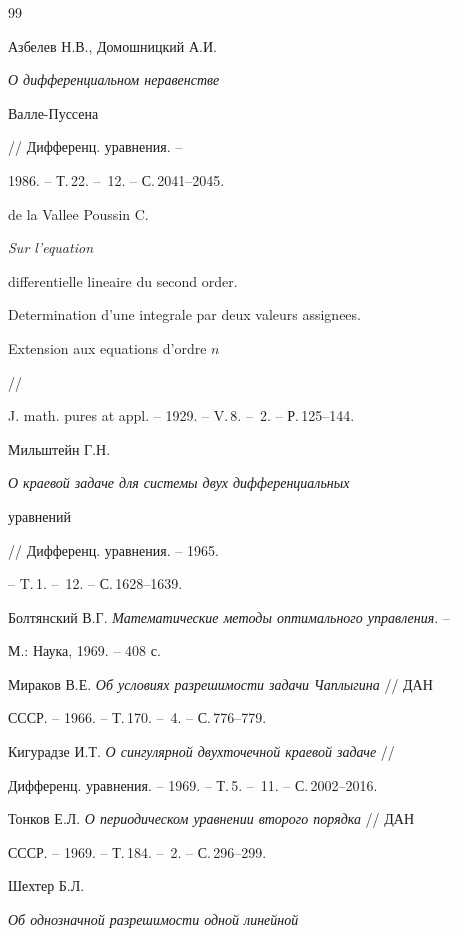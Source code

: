 \begin{thebibliography}{99} 


 




Азбелев Н.В., Домошницкий А.И. {\em О дифференциальном неравенстве 


Валле-Пуссена} // Дифференц. уравнения. -- 


1986. -- Т.\,22. -- \No\,12. -- С.\,2041--2045. 




de la Vallee Poussin C. {\em Sur l'equation 


differentielle lineaire du second order. 


Determination d'une integrale par deux valeurs assignees. 


Extension aux equations d'ordre $n$} // 


J. math. pures at appl. -- 1929. -- V.\,8. -- \No\,2. -- Р.\,125--144. 




Мильштейн Г.Н. {\em О краевой задаче для системы двух дифференциальных 


уравнений} // Дифференц. уравнения. -- 1965. 


-- T.\,1. -- \No\,12. -- С.\,1628--1639. 




Болтянский В.Г. {\em Математические методы оптимального управления}. -- 


М.: Наука, 1969. -- 408 с. 




Мираков В.Е. {\em Об условиях разрешимости задачи Чаплыгина} // ДАН 


СССР. -- 1966. -- Т.\,170. -- \No\,4. -- С.\,776--779. 




Кигурадзе И.Т. {\em О сингулярной двухточечной краевой задаче} // 


Дифференц. уравнения. -- 1969. -- Т.\,5. -- \No\,11. -- С.\,2002--2016. 




Тонков Е.Л. {\em О периодическом уравнении второго порядка} // ДАН 


СССР. -- 1969. -- Т.\,184. -- \No\,2. -- С.\,296--299. 




Шехтер Б.Л. {\em Об однозначной разрешимости одной линейной 


}
\end{thebibliography}
